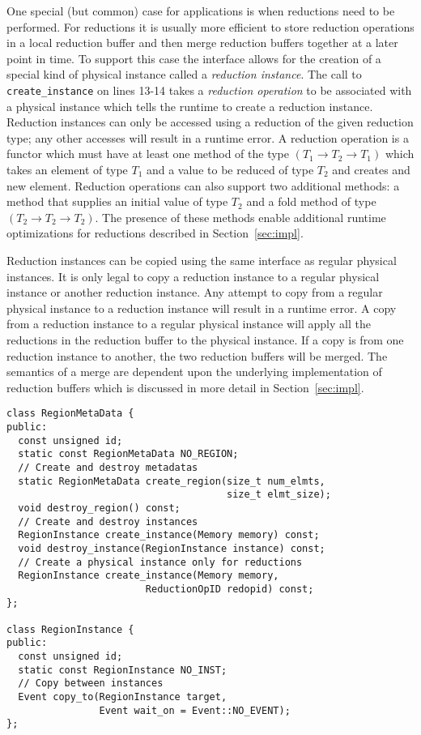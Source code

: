 One special (but common) case for applications is when reductions need to be performed.
For reductions it is usually more efficient to store reduction
operations in a local reduction buffer and then merge reduction buffers together at a later
point in time.  To support this case the interface allows for the creation of a special kind
of physical instance called a {\em reduction instance}.  The call to {\tt create\_instance} on
lines 13-14 takes a {\em reduction operation} to be associated with a physical instance which
tells the runtime to create a reduction instance.  Reduction instances can only be accessed
using a reduction of the given reduction type; any other accesses will result in a runtime
error.  A reduction operation is a functor which must have at least one method of the type
$(T_1 \rightarrow T_2 \rightarrow T_1)$ which takes an element of type $T_1$ and a value
to be reduced of type $T_2$ and creates and new element.  Reduction operations can also
support two additional methods: a method that supplies an initial value of type $T_2$ and a 
fold method of type $(T_2 \rightarrow T_2 \rightarrow T_2)$.  The presence of these methods
enable additional runtime optimizations for reductions described in Section~\ref{sec:impl}.

Reduction instances can be copied using the same interface as regular physical instances.
It is only legal to copy a reduction instance to a regular physical instance or another
reduction instance.  Any attempt to copy from a regular physical instance to a reduction
instance will result in a runtime error.  A copy from a reduction instance to a regular
physical instance will apply all the reductions in the reduction buffer to the physical
instance.  If a copy is from one reduction instance to another, the two reduction buffers
will be merged.  The semantics of a merge are dependent upon the underlying implementation
of reduction buffers which is discussed in more detail in Section~\ref{sec:impl}.

\begin{lstlisting}[float={t},label={lst:regionapi},caption={Subset of Physical Region Interface.}]
class RegionMetaData {
public:
  const unsigned id;
  static const RegionMetaData NO_REGION;
  // Create and destroy metadatas
  static RegionMetaData create_region(size_t num_elmts, 
                                      size_t elmt_size);
  void destroy_region() const;
  // Create and destroy instances
  RegionInstance create_instance(Memory memory) const;
  void destroy_instance(RegionInstance instance) const;
  // Create a physical instance only for reductions
  RegionInstance create_instance(Memory memory, 
                        ReductionOpID redopid) const;
};

class RegionInstance {
public:
  const unsigned id;
  static const RegionInstance NO_INST;
  // Copy between instances
  Event copy_to(RegionInstance target, 
                Event wait_on = Event::NO_EVENT);
};
\end{lstlisting}

